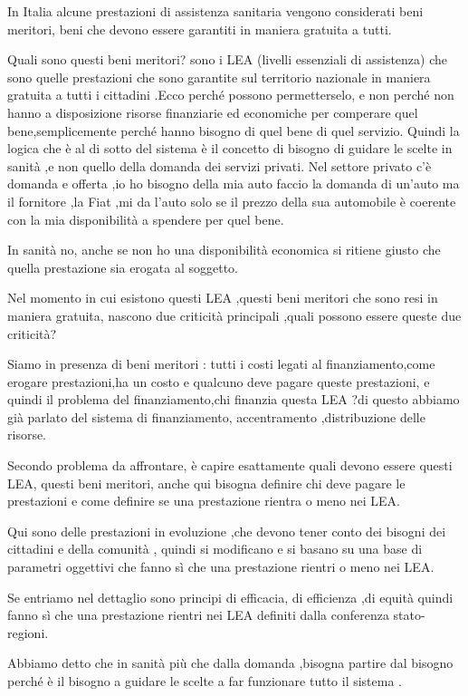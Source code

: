 \documentclass[]{article}
\begin{document}
In Italia alcune prestazioni di assistenza sanitaria vengono considerati
beni meritori, beni che devono essere garantiti in maniera gratuita a
tutti.

Quali sono questi beni meritori? sono i LEA (livelli essenziali di
assistenza) che sono quelle prestazioni che sono garantite sul
territorio nazionale in maniera gratuita a tutti i cittadini .Ecco
perché possono permetterselo, e non perché non hanno a disposizione
risorse finanziarie ed economiche per comperare quel bene,semplicemente
perché hanno bisogno di quel bene di quel servizio. Quindi la logica che
è al di sotto del sistema è il concetto di bisogno di guidare le scelte
in sanità ,e non quello della domanda dei servizi privati. Nel settore
privato c'è domanda e offerta ,io ho bisogno della mia auto faccio la
domanda di un'auto ma il fornitore ,la Fiat ,mi da l'auto solo se il
prezzo della sua automobile è coerente con la mia disponibilità a
spendere per quel bene.

In sanità no, anche se non ho una disponibilità economica si ritiene
giusto che quella prestazione sia erogata al soggetto.

Nel momento in cui esistono questi LEA ,questi beni meritori che sono
resi in maniera gratuita, nascono due criticità principali ,quali
possono essere queste due criticità?

Siamo in presenza di beni meritori : tutti i costi legati al
finanziamento,come erogare prestazioni,ha un costo e qualcuno deve
pagare queste prestazioni, e quindi il problema del finanziamento,chi
finanzia questa LEA ?di questo abbiamo già parlato del sistema di
finanziamento, accentramento ,distribuzione delle risorse.

Secondo problema da affrontare, è capire esattamente quali devono essere
questi LEA, questi beni meritori, anche qui bisogna definire chi deve
pagare le prestazioni e come definire se una prestazione rientra o meno
nei LEA.

Qui sono delle prestazioni in evoluzione ,che devono tener conto dei
bisogni dei cittadini e della comunità , quindi si modificano e si
basano su una base di parametri oggettivi che fanno sì che una
prestazione rientri o meno nei LEA.

Se entriamo nel dettaglio sono principi di efficacia, di efficienza ,di
equità quindi fanno sì che una prestazione rientri nei LEA definiti
dalla conferenza stato-regioni.

Abbiamo detto che in sanità più che dalla domanda ,bisogna partire dal
bisogno perché è il bisogno a guidare le scelte a far funzionare tutto
il sistema .
\end{document}
